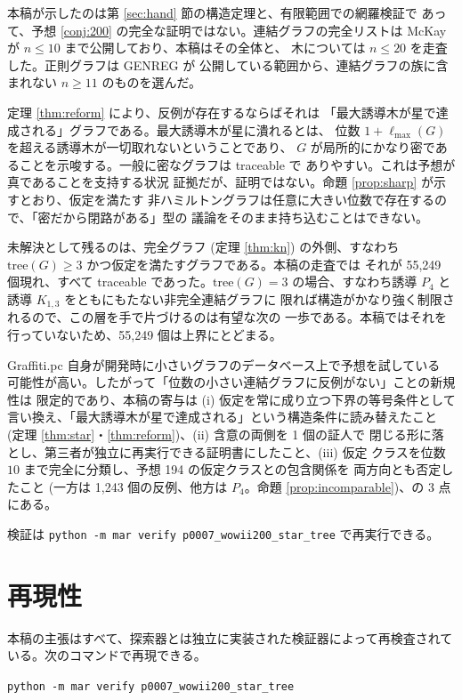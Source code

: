 \documentclass[paper=a4,fontsize=10.5pt,jafontsize=10.5pt]{jlreq}
\theoremstyle{plain}
\theoremstyle{definition}
\begin{document}
本稿が示したのは第 \ref{sec:hand} 節の構造定理と、有限範囲での網羅検証で
あって、予想 \ref{conj:200} の完全な証明ではない。連結グラフの完全リストは
McKay \cite{mckay} が $n \le 10$ まで公開しており、本稿はその全体と、
木については $n \le 20$ を走査した。正則グラフは GENREG \cite{genreg} が
公開している範囲から、連結グラフの族に含まれない $n \ge 11$ のものを選んだ。

定理 \ref{thm:reform} により、反例が存在するならばそれは
「最大誘導木が星で達成される」グラフである。最大誘導木が星に潰れるとは、
位数 $1 + \ell_{\max}(G)$ を超える誘導木が一切取れないということであり、
$G$ が局所的にかなり密であることを示唆する。一般に密なグラフは traceable で
ありやすい。これは予想が真であることを支持する状況
証拠だが、証明ではない。命題 \ref{prop:sharp} が示すとおり、仮定を満たす
非ハミルトングラフは任意に大きい位数で存在するので、「密だから閉路がある」型の
議論をそのまま持ち込むことはできない。

未解決として残るのは、完全グラフ (定理 \ref{thm:kn}) の外側、すなわち
$\mathrm{tree}(G) \ge 3$ かつ仮定を満たすグラフである。本稿の走査では
それが 55,249 個現れ、すべて traceable であった。$\mathrm{tree}(G) = 3$
の場合、すなわち誘導 $P_4$ と誘導 $K_{1,3}$ をともにもたない非完全連結グラフに
限れば構造がかなり強く制限されるので、この層を手で片づけるのは有望な次の
一歩である。本稿ではそれを行っていないため、55,249 個は上界にとどまる。

Graffiti.pc 自身が開発時に小さいグラフのデータベース上で予想を試している
可能性が高い。したがって「位数の小さい連結グラフに反例がない」ことの新規性は
限定的であり、本稿の寄与は (i) 仮定を常に成り立つ下界の等号条件として
言い換え、「最大誘導木が星で達成される」という構造条件に読み替えたこと
(定理 \ref{thm:star}・\ref{thm:reform})、(ii) 含意の両側を 1 個の証人で
閉じる形に落とし、第三者が独立に再実行できる証明書にしたこと、(iii) 仮定
クラスを位数 $10$ まで完全に分類し、予想 194 の仮定クラスとの包含関係を
両方向とも否定したこと (一方は 1,243 個の反例、他方は $P_4$。命題
\ref{prop:incomparable})、の 3 点にある。

\medskip
\noindent
検証は \texttt{python -m mar verify p0007\_wowii200\_star\_tree} で再実行できる。


\section*{再現性}
本稿の主張はすべて、探索器とは独立に実装された検証器によって再検査されている。次のコマンドで再現できる。

\begin{center}\texttt{python -m mar verify p0007\_wowii200\_star\_tree}\end{center}
\end{document}
